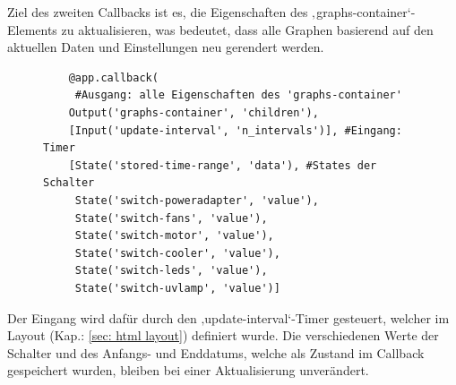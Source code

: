 Ziel des zweiten Callbacks ist es, die Eigenschaften des ‚graphs-container‘- Elements zu aktualisieren, was bedeutet, dass alle Graphen basierend auf den aktuellen Daten und Einstellungen neu gerendert werden. 
\vspace{3mm}
\begin{figure}[H]
    \centering
    \begin{verbatim}
    @app.callback(
     #Ausgang: alle Eigenschaften des 'graphs-container'
    Output('graphs-container', 'children'),
    [Input('update-interval', 'n_intervals')], #Eingang: Timer
    [State('stored-time-range', 'data'), #States der Schalter 
     State('switch-poweradapter', 'value'),
     State('switch-fans', 'value'),
     State('switch-motor', 'value'),
     State('switch-cooler', 'value'),
     State('switch-leds', 'value'),
     State('switch-uvlamp', 'value')]

    \end{verbatim}
\end{figure}
Der Eingang wird dafür durch den ‚update-interval‘-Timer gesteuert, welcher im Layout (Kap.: \ref{sec: html layout}) definiert wurde. Die verschiedenen Werte der Schalter und des Anfangs- und Enddatums, welche als Zustand im Callback gespeichert wurden, bleiben bei einer Aktualisierung unverändert. 

